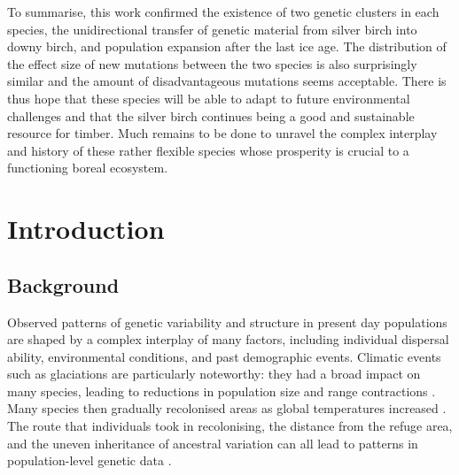 \documentclass[hidelinks,11pt]{article}
\begin{document}
    To summarise, this work confirmed the existence of two genetic clusters in each species, the unidirectional transfer of genetic material from silver birch into downy birch, and population expansion after the last ice age. The distribution of the effect size of new mutations between the two species is also surprisingly similar and the amount of disadvantageous mutations seems acceptable. There is thus hope that these species will be able to adapt to future environmental challenges and that the silver birch continues being a good and sustainable resource for timber. Much remains to be done to unravel the complex interplay and history of these rather flexible species whose prosperity is crucial to a functioning boreal ecosystem.

    \endgroup
    \clearpage
    \restoregeometry
    \shipout\null


    \tableofcontents
    \thispagestyle{empty}
    \clearpage

    \printglossary[type=\acronymtype,title=Acronyms,toctitle=Acronyms]

    \clearpage
    \shipout\null

    \listoffigures

    \clearpage

    \listoftables

    \thispagestyle{empty}

    \clearpage
    \shipout\null


    \section{Introduction}
    \label{sec:introduction}

    \subsection{Background}
    \label{sec:background}

    Observed patterns of genetic variability and structure in present day populations are shaped by a complex interplay of many factors, including individual dispersal ability, environmental conditions, and past demographic events. Climatic events such as glaciations are particularly noteworthy: they had a broad impact on many species, leading to reductions in population size and range contractions \cite{recolonisation-birch}. Many species then gradually recolonised areas as global temperatures increased \cite{birch-climate-change-treeline}. The route that individuals took in recolonising, the distance from the refuge area, and the uneven inheritance of ancestral variation can all lead to patterns in population-level genetic data \cite{recolonisation-birch}.
\end{document}
